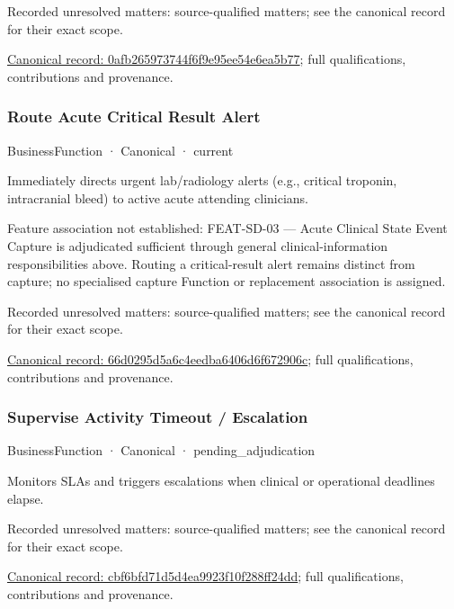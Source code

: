 {\small Recorded unresolved matters: source-qualified matters; see the canonical record for their exact scope.}\par
{\footnotesize \href{../../../../continuum/business/business-function/0afb265973744f6f9e95ee54e6ea5b77.md}{Canonical record: 0afb265973744f6f9e95ee54e6ea5b77}; full qualifications, contributions and provenance.}\par
\subsubsection{Route Acute Critical Result Alert}

\label{element:66d0295d5a6c4eedba6406d6f672906c}
{\small BusinessFunction · Canonical · current}\par

Immediately directs urgent lab/radiology alerts (e.g., critical troponin, intracranial bleed) to active acute attending clinicians.



Feature association not established: FEAT-SD-03 — Acute Clinical State Event Capture is adjudicated sufficient through general clinical-information responsibilities above. Routing a critical-result alert remains distinct from capture; no specialised capture Function or replacement association is assigned.


{\small Recorded unresolved matters: source-qualified matters; see the canonical record for their exact scope.}\par
{\footnotesize \href{../../../../continuum/business/business-function/66d0295d5a6c4eedba6406d6f672906c.md}{Canonical record: 66d0295d5a6c4eedba6406d6f672906c}; full qualifications, contributions and provenance.}\par
\subsubsection{Supervise Activity Timeout / Escalation}

\label{element:cbf6bfd71d5d4ea9923f10f288ff24dd}
{\small BusinessFunction · Canonical · pending\_adjudication}\par

Monitors SLAs and triggers escalations when clinical or operational deadlines elapse.


{\small Recorded unresolved matters: source-qualified matters; see the canonical record for their exact scope.}\par
{\footnotesize \href{../../../../continuum/business/business-function/cbf6bfd71d5d4ea9923f10f288ff24dd.md}{Canonical record: cbf6bfd71d5d4ea9923f10f288ff24dd}; full qualifications, contributions and provenance.}\par
